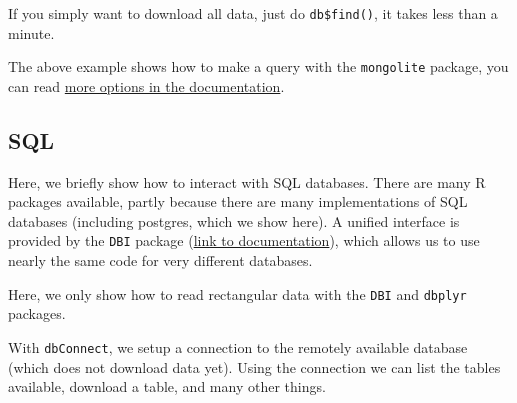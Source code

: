 \documentclass[]{book}
\let\BeginKnitrBlock\begin \let\EndKnitrBlock\end
\begin{document}
If you simply want to download all data, just do \texttt{db\$find()}, it takes less than a minute.

\BeginKnitrBlock{rmdreading}
The above example shows how to make a query with the \texttt{mongolite} package, you can read \href{https://jeroen.github.io/mongolite/query-data.html}{more options in the documentation}.
\EndKnitrBlock{rmdreading}

\hypertarget{sql}{%
\subsection{SQL}\label{sql}}

Here, we briefly show how to interact with SQL databases. There are many R packages available, partly because there are many implementations of SQL databases (including postgres, which we show here). A unified interface is provided by the \texttt{DBI} package (\href{https://db.rstudio.com/dbi/}{link to documentation}), which allows us to use nearly the same code for very different databases.

Here, we only show how to read rectangular data with the \texttt{DBI} and \texttt{dbplyr} packages.

With \texttt{dbConnect}, we setup a connection to the remotely available database (which does not download data yet). Using the connection we can list the tables available, download a table, and many other things.
\end{document}

